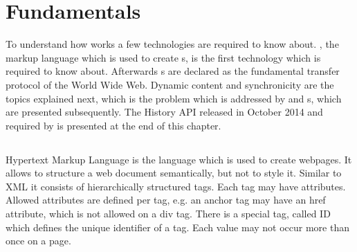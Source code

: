 \section{Fundamentals}

To understand how \lare{} works a few technologies are required to know about.
\html{}, the markup language which is used to create \webPage{}s, is the first technology which is required to know about.
Afterwards \httpRequest{}s are declared as the fundamental transfer protocol of the World Wide Web.
Dynamic content and synchronicity are the topics explained next, which is the problem which is addressed by \ajax{} and \singlePageApplication{}s, which are presented subsequently.
The History API released in October 2014 and required by \lare{} is presented at the end of this chapter.

\subsection{\html{}\label{html}}
Hypertext Markup Language is the language which is used to create webpages.
It allows to structure a web document semantically, but not to style it.
Similar to XML it consists of hierarchically structured tags.
Each tag may have attributes.
Allowed attributes are defined per tag, e.g. an anchor tag may have an href attribute, which is not allowed on a div tag.
There is a special tag, called ID which defines the unique identifier of a tag.
Each value may not occur more than once on a page.


